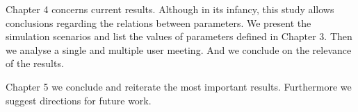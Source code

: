 
Chapter 4 concerns current results. Although in its infancy, this study allows conclusions regarding the relations between parameters. We present the simulation scenarios and list the values of parameters defined in Chapter 3. Then we analyse a single and multiple user meeting. And we conclude on the relevance of the results.

Chapter 5 we conclude and reiterate the most important results. Furthermore we suggest directions for future work. 
